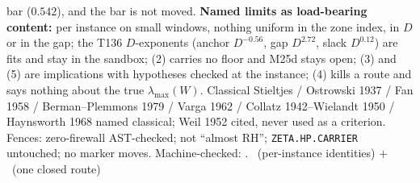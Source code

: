 \documentclass[11pt,a4paper]{article}
\begin{document}
bar ($0.542$), and the bar is not moved.
\textbf{Named limits as load-bearing content:} per instance on small windows,
nothing uniform in the zone index, in $D$ or in the gap; the T136 $D$-exponents
(anchor $D^{-0.56}$, gap $D^{2.72}$, slack $D^{0.12}$) are fits and stay in the
sandbox; (2) carries no floor and M25d stays open; (3) and (5) are implications
with hypotheses checked at the instance; (4) kills a route and says nothing about
the true $\lambda_{\max}(W)$. Classical Stieltjes / Ostrowski 1937 / Fan 1958 /
Berman--Plemmons 1979 / Varga 1962 / Collatz 1942--Wielandt 1950 /
Haynsworth 1968 named classical; Weil 1952 cited, never used as a criterion.
Fences: zero-firewall AST-checked; not ``almost RH'';
\texttt{ZETA.HP.CARRIER} untouched; no marker moves.
Machine-checked: .
\mE\ (per-instance identities) $+$ \mX\ (one closed route)
\end{document}
